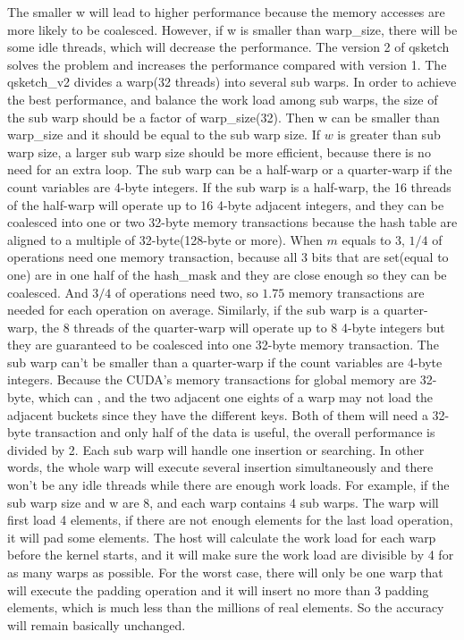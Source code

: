 \documentclass[conference]{IEEEtran}
\begin{document}
The smaller w will lead to higher performance because the memory accesses are more likely to be coalesced. However, if w is smaller than warp\_size, there will be some idle threads, which will decrease the performance. The version 2 of qsketch solves the problem and increases the performance compared with version 1. The qsketch\_v2 divides a warp(32 threads) into several sub warps. In order to achieve the best performance, and balance the work load among sub warps, the size of the sub warp should be a factor of warp\_size(32). Then w can be smaller than warp\_size and it should be equal to the sub warp size. If $w$ is greater than sub warp size, a larger sub warp size should be more efficient, because there is no need for an extra loop. The sub warp can be a half-warp or a quarter-warp if the count variables are 4-byte integers. If the sub warp is a half-warp, the 16 threads of the half-warp will operate up to 16 4-byte adjacent integers, and they can be coalesced into one or two 32-byte memory transactions because the hash table are aligned to a multiple of 32-byte(128-byte or more). When $m$ equals to 3, $1/4$ of operations need one memory transaction, because all 3 bits that are set(equal to one) are in one half of the hash\_mask and they are close enough so they can be coalesced. And $3/4$ of operations need two, so $1.75$ memory transactions are needed for each operation on average. Similarly, if the sub warp is a quarter-warp, the 8 threads of the quarter-warp will operate up to 8 4-byte integers but they are guaranteed to be coalesced into one 32-byte memory transaction.
The sub warp can't be smaller than a quarter-warp if the count variables are 4-byte integers. Because the CUDA's memory transactions for global memory are 32-byte, which can , and the two adjacent one eights of a warp may not load the adjacent buckets since they have the different keys. Both of them will need a 32-byte transaction and only half of the data is useful, the overall performance is divided by 2.
Each sub warp will handle one insertion or searching. In other words, the whole warp will execute several insertion simultaneously and there won’t be any idle threads while there are enough work loads. For example, if the sub warp size and w are 8, and each warp contains 4 sub warps. The warp will first load 4 elements, if there are not enough elements for the last load operation, it will pad some elements. The host will calculate the work load for each warp before the kernel starts, and it will make sure the work load are divisible by 4 for as many warps as possible. For the worst case, there will only be one warp that will execute the padding operation and it will insert no more than 3 padding elements, which is much less than the millions of real elements. So the accuracy will remain basically unchanged. 
\end{document}
